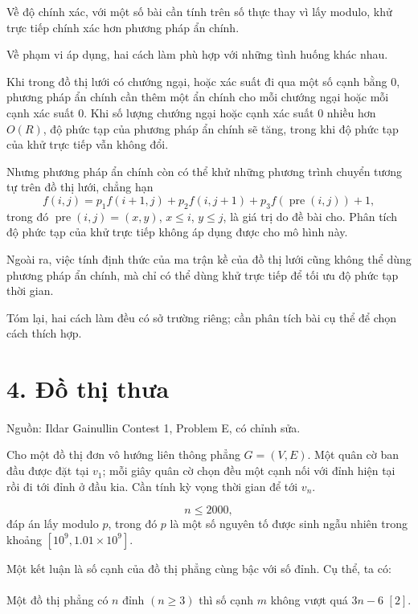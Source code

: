 \documentclass[11pt]{article}
\begin{document}
Về độ chính xác, với một số bài cần tính trên số thực thay vì lấy modulo, khử
trực tiếp chính xác hơn phương pháp ẩn chính.

Về phạm vi áp dụng, hai cách làm phù hợp với những tình huống khác nhau.

Khi trong đồ thị lưới có chướng ngại, hoặc xác suất đi qua một số cạnh bằng
\(0\), phương pháp ẩn chính cần thêm một ẩn chính cho mỗi chướng ngại hoặc mỗi
cạnh xác suất \(0\). Khi số lượng chướng ngại hoặc cạnh xác suất \(0\) nhiều
hơn \(O(R)\), độ phức tạp của phương pháp ẩn chính sẽ tăng, trong khi độ phức
tạp của khử trực tiếp vẫn không đổi.

Nhưng phương pháp ẩn chính còn có thể khử những phương trình chuyển tương tự
trên đồ thị lưới, chẳng hạn
\[
  f(i,j)=p_1f(i+1,j)+p_2f(i,j+1)+p_3f(\operatorname{pre}(i,j))+1,
\]
trong đó \(\operatorname{pre}(i,j)=(x,y)\), \(x\le i\), \(y\le j\), là giá trị
do đề bài cho. Phân tích độ phức tạp của khử trực tiếp không áp dụng được cho
mô hình này.

Ngoài ra, việc tính định thức của ma trận kề của đồ thị lưới cũng không thể
dùng phương pháp ẩn chính, mà chỉ có thể dùng khử trực tiếp để tối ưu độ phức
tạp thời gian.

Tóm lại, hai cách làm đều có sở trường riêng; cần phân tích bài cụ thể để chọn
cách thích hợp.

\section*{4. Đồ thị thưa}

\paragraph{}
Nguồn: Ildar Gainullin Contest 1, Problem E, có chỉnh sửa.

Cho một đồ thị đơn vô hướng liên thông phẳng \(G=(V,E)\). Một quân cờ ban đầu
được đặt tại \(v_1\); mỗi giây quân cờ chọn đều một cạnh nối với đỉnh hiện tại
rồi đi tới đỉnh ở đầu kia. Cần tính kỳ vọng thời gian để tới \(v_n\).

\[
  n\le2000,
\]
đáp án lấy modulo \(p\), trong đó \(p\) là một số nguyên tố được sinh ngẫu
nhiên trong khoảng \([10^9,1.01\times10^9]\).

Một kết luận là số cạnh của đồ thị phẳng cùng bậc với số đỉnh. Cụ thể, ta có:

\paragraph{}
Một đồ thị phẳng có \(n\) đỉnh \((n\ge3)\) thì số cạnh \(m\) không vượt quá
\(3n-6\) \([2]\).
\end{document}
